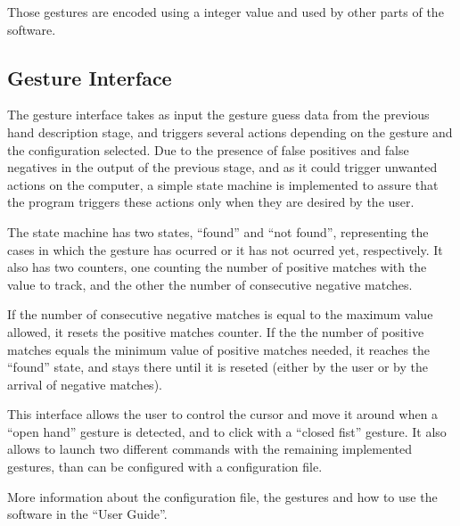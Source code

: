 Those gestures are encoded using a integer value and used by other parts of the software.


\subsection{Gesture Interface} 

The gesture interface takes as input the gesture guess data from the previous hand description stage, and triggers several actions depending on the gesture and the configuration selected. Due to the presence of false positives and false negatives in the output of the previous stage, and as it could trigger unwanted actions on the computer, a simple state machine is implemented to assure that the program triggers these actions only when they are desired by the user.

The state machine has two states, ``found'' and ``not found'', representing the cases in which the gesture has ocurred or it has not ocurred yet, respectively. It also has two counters, one counting the number of positive matches with the value to track, and the other the number of consecutive negative matches.

If the number of consecutive negative matches is equal to the maximum value allowed, it resets the positive matches counter. If the the number of positive matches equals the minimum value of positive matches needed, it reaches the ``found'' state, and stays there until it is reseted (either by the user or by the arrival of negative matches). 


This interface allows the user to control the cursor and move it around when a ``open hand'' gesture is detected, and to click with a ``closed fist'' gesture. It also allows to launch two different commands with the remaining implemented gestures, than can be configured with a configuration file.

More information about the configuration file, the gestures and how to use the software in the ``User Guide''. 

\newpage